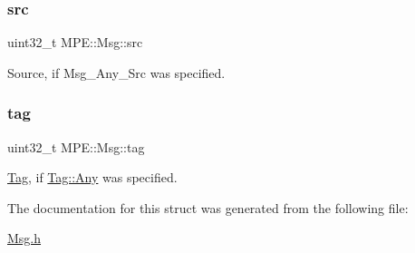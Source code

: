 \mbox{\label{struct_m_p_e_1_1_msg_a5fd5790137b7e5916b13c7a5375cc6f3}} 
\subsubsection{\texorpdfstring{src}{src}}
{\footnotesize\ttfamily uint32\+\_\+t M\+P\+E\+::\+Msg\+::src}

Source, if Msg\+\_\+\+Any\+\_\+\+Src was specified. \mbox{\label{struct_m_p_e_1_1_msg_a04b1b5fb0cdbb84226609f15d621e21b}} 
\subsubsection{\texorpdfstring{tag}{tag}}
{\footnotesize\ttfamily uint32\+\_\+t M\+P\+E\+::\+Msg\+::tag}

\hyperlink{namespace_m_p_e_1_1_tag}{Tag}, if \hyperlink{namespace_m_p_e_1_1_tag_aa5b0456e2af78c51452dd5a5a9b39b8c}{Tag\+::\+Any} was specified. 

The documentation for this struct was generated from the following file\+:\begin{DoxyCompactItemize}
\item 
\hyperlink{_msg_8h}{Msg.\+h}\end{DoxyCompactItemize}
